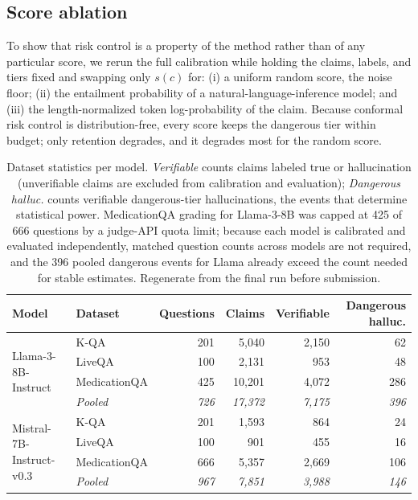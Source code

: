 \subsection{Score ablation}
\label{sec:ablation}
To show that risk control is a property of the method rather than of any particular
score, we rerun the full calibration while holding the claims, labels, and tiers
fixed and swapping only $s(c)$ for: (i) a uniform random score, the noise floor;
(ii) the entailment probability of a natural-language-inference model; and (iii) the
length-normalized token log-probability of the claim. Because conformal risk control
is distribution-free, every score keeps the dangerous tier within budget; only
retention degrades, and it degrades most for the random score.

\begin{table}[t]
\centering
\footnotesize
\setlength{\tabcolsep}{6pt}
\begin{tabular}{llrrrr}
\toprule
Model & Dataset & Questions & Claims & Verifiable & Dangerous halluc. \\
\midrule
\multirow{4}{*}{Llama-3-8B-Instruct}
  & K-QA          & 201 & 5{,}040  & 2{,}150 & 62 \\
  & LiveQA        & 100 & 2{,}131  & 953     & 48 \\
  & MedicationQA  & 425 & 10{,}201 & 4{,}072 & 286 \\
  & \textit{Pooled} & \textit{726} & \textit{17{,}372} & \textit{7{,}175} & \textit{396} \\
\midrule
\multirow{4}{*}{Mistral-7B-Instruct-v0.3}
  & K-QA          & 201 & 1{,}593 & 864     & 24 \\
  & LiveQA        & 100 & 901     & 455     & 16 \\
  & MedicationQA  & 666 & 5{,}357 & 2{,}669 & 106 \\
  & \textit{Pooled} & \textit{967} & \textit{7{,}851} & \textit{3{,}988} & \textit{146} \\
\bottomrule
\end{tabular}
\caption{Dataset statistics per model. \emph{Verifiable} counts claims labeled true
or hallucination (unverifiable claims are excluded from calibration and evaluation);
\emph{Dangerous halluc.} counts verifiable dangerous-tier hallucinations, the events
that determine statistical power. MedicationQA grading for Llama-3-8B was capped at
425 of 666 questions by a judge-API quota limit; because each model is calibrated and
evaluated independently, matched question counts across models are not required, and
the 396 pooled dangerous events for Llama already exceed the count needed for stable
estimates. Regenerate from the final run before submission.}
\label{tab:data}
\end{table}
